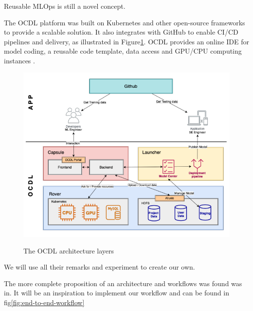 Reusable MLOps is still a novel concept\cite{10690392}.

The OCDL platform\cite{LIU2020704} was built on Kubernetes and other open-source frameworks to provide a scalable solution.
It also integrates with GitHub to enable CI/CD pipelines and delivery, as illustrated in Figure\ref{fig:ocdl}.
OCDL provides an online IDE for model coding, a reusable code template, data access and GPU/CPU computing instances\cite{LIU2020704} .

\begin{figure}[!htbp]
    \caption{The OCDL architecture layers\cite{LIU2020704}}
    \centering
    \includegraphics[scale=0.5]{images/ocdl-architecture}
    \label{fig:ocdl}
\end{figure}

We will use all their remarks and experiment to create our own.

The more complete proposition of an architecture and workflows was found was in\cite{Kreuzberger2022MachineLO}.
It will be an inspiration to implement our workflow and can be found in fig\ref{fig:end-to-end-workflow}

